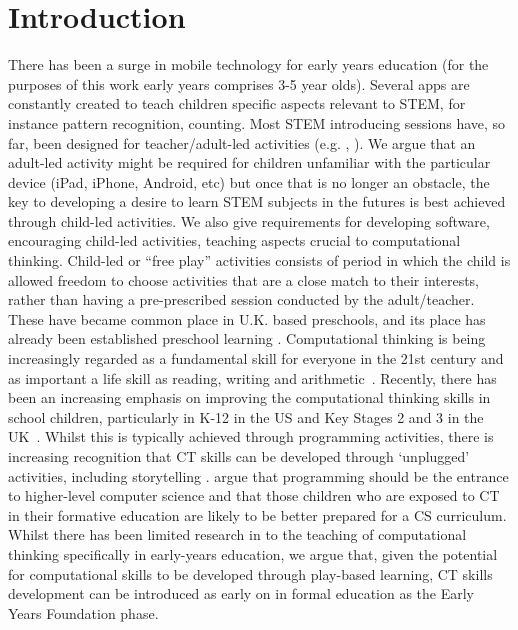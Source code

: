 \documentclass{sig-alternate}
\begin{document}
\section{Introduction}
There has been a surge in mobile technology for early years education (for the purposes of this work early years comprises 3-5 year olds). Several apps are constantly created to teach children specific aspects relevant to STEM, for instance pattern recognition, counting. Most STEM introducing sessions have, so far, been designed for teacher/adult-led activities (e.g. \cite{aronin2013},  \cite{abbas2014ontocog}). We argue that an adult-led activity might be required for children unfamiliar with the particular device (iPad, iPhone, Android, etc) but once that is no longer an obstacle, the key to developing a desire to learn STEM subjects in the futures is best achieved through child-led activities. We also give requirements for developing software, encouraging child-led activities, teaching aspects crucial to computational thinking. Child-led or ``free play'' activities \cite{bredekamp1987developmentally} consists of period in which the child is allowed freedom to choose activities that are a close match to their interests, rather than having a pre-prescribed session conducted by the adult/teacher. These have became common place in U.K. based preschools, and its place has already been established preschool learning \cite{DiChilvers}.
Computational thinking is being increasingly regarded as a fundamental skill for everyone in the 21st century \cite{Yadav2014} and as important a life skill as reading, writing and arithmetic~\cite{wing2006}.  Recently, there has been an increasing emphasis on improving the computational thinking skills in school children, particularly in K-12 in the US \cite{Settle2012} and Key Stages 2 and 3 in the UK~\cite{brown-et-al-sigcse2012,brown-et-al-toce2014}.  Whilst this is typically achieved through programming activities, there is increasing recognition that CT skills can be developed through `unplugged' activities, including storytelling \cite{Thies2012}.  \cite{Lu2009} argue that programming should be the entrance to higher-level computer science and that those children who are exposed to CT in their formative education are likely to be better prepared for a CS curriculum.  Whilst there has been limited research in to the teaching of computational thinking specifically in early-years education, we argue that, given the potential for computational skills to be developed through play-based learning, CT skills development can be introduced as early on in formal education as the Early Years Foundation phase. 
\end{document}
